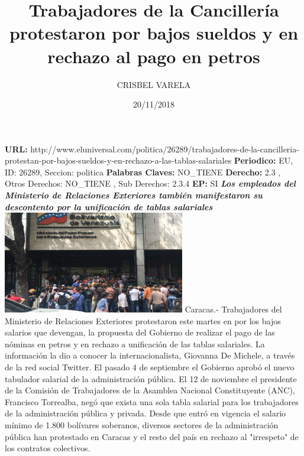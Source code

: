 \documentclass{article}%
\title{\textbf{Trabajadores de la Cancillería protestaron por bajos sueldos y en rechazo al pago en petros}}%
\author{CRISBEL VARELA}%
\date{20/11/2018}%
\begin{document}
%
\normalsize%
\maketitle%
\textbf{URL: }%
http://www.eluniversal.com/politica/26289/trabajadores{-}de{-}la{-}cancilleria{-}protestan{-}por{-}bajos{-}sueldos{-}y{-}en{-}rechazo{-}a{-}las{-}tablas{-}salariales\newline%
%
\textbf{Periodico: }%
EU, %
ID: %
26289, %
Seccion: %
politica\newline%
%
\textbf{Palabras Claves: }%
NO\_TIENE\newline%
%
\textbf{Derecho: }%
2.3%
, Otros Derechos: %
NO\_TIENE%
, Sub Derechos: %
2.3.4%
\newline%
%
\textbf{EP: }%
SI\newline%
\newline%
%
\textbf{\textit{Los empleados del Ministerio de Relaciones Exteriores también manifestaron su descontento por la unificación de tablas salariales}}%
\newline%
\newline%
%
\includegraphics[width=300px]{206.jpg}%
\newline%
%
Caracas.{-} Trabajadores del Ministerio de Relaciones Exteriores protestaron este martes en por los bajos salarios que devengan, la propuesta del Gobierno de realizar el pago de las nóminas en petros y en rechazo a unificación de las tablas salariales.%
\newline%
%
La información la dio a conocer la internacionalista, Giovanna De Michele, a través de la red social Twitter.%
\newline%
%
El pasado 4 de septiembre el Gobierno aprobó el nuevo tabulador salarial de la administración pública.%
\newline%
%
El 12 de noviembre el presidente de la Comisión de Trabajadores de la Asamblea Nacional Constituyente (ANC), Francisco Torrealba, negó que exista una sola tabla salarial para los trabajadores de la administración pública y privada.%
\newline%
%
Desde que entró en vigencia el salario mínimo de 1.800 bolívares soberanos, diversos sectores de la administración pública han protestado en Caracas y el resto del país en rechazo al "irrespeto" de los contratos colectivos.%
\newline%
%
\end{document}
